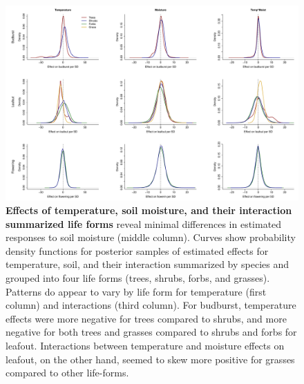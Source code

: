 \documentclass{article}
\begin{document}
\begin{figure}[h]
\centering
 \includegraphics{../../Analyses/soilmoisture/figures/curvebbloflform_widexaxis.pdf}
  \caption{\textbf{Effects of temperature, soil moisture, and their interaction summarized life forms} reveal minimal differences in estimated responses to soil moisture (middle column). Curves show probability density functions for posterior samples of estimated effects for temperature, soil, and their interaction summarized by species and grouped into four life forms (trees, shrubs, forbs, and grasses). Patterns do appear to vary by life form for temperature (first column) and interactions (third column).  For budburst, temperature effects were more negative for trees compared to shrubs, and more negative for both trees and grasses compared to shrubs and forbs for leafout. Interactions between temperature and moisture effects on leafout, on the other hand, seemed to skew more positive for grasses compared to other life-forms.} %
 \label{fig:forms}
 \end{figure}
\end{document}
